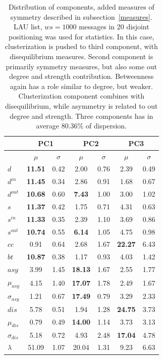 \documentclass[%
 aip,
 jmp,%
 amsmath,amssymb,
 reprint,%
]{revtex4-1}
\begin{document}
\begin{table}
  \centering
  \begin{tabular}{|l|c|c| c|c| c|c|}\hline
 & \multicolumn{2}{c|}{PC1} & \multicolumn{2}{c|}{PC2} & \multicolumn{2}{c|}{PC3}  \\\hline
       & $\mu$ & $\sigma$ & $\mu$ & $\sigma$ & $\mu$ & $\sigma$  \\\hline
$d$            & {\bf 11.51} & 0.42 & 2.00  & 0.76 & 2.39  & 0.49 \\ 
$d^{in}$       & {\bf 11.45} & 0.34 & 2.86  & 0.91 & 1.68  & 0.67 \\
$d^{out}$      & {\bf 10.68} & 0.60 & {\bf 7.43}  & 1.00 & 3.00  & 1.02 \\
$s$            & {\bf 11.37} & 0.42 & 1.75  & 0.71 & 4.31  & 0.63 \\ 
$s^{in}$       & {\bf 11.33} & 0.35 & 2.39  & 1.10 & 3.69  & 0.86 \\ 
$s^{out}$      & {\bf 10.74} & 0.55 & {\bf 6.14}  & 1.05 & 4.75  & 0.98 \\ \hline
$cc$           & 0.91        & 0.64 & 2.68  & 1.67 & {\bf 22.27} & 6.43 \\ 
$bt$           & {\bf 10.87} & 0.38 & 1.17  & 0.93 & 4.03  & 1.42 \\ \hline
$asy$          & 3.99        & 1.45 & {\bf 18.13} & 1.67 & 2.55  & 1.77 \\
$\mu_{asy}$    & 4.15        & 1.40 & {\bf 17.07} & 1.78 & 2.49  & 1.67 \\
$\sigma_{asy}$ & 1.21        & 0.67 & {\bf 17.49} & 0.79 & 3.29  & 2.33 \\
$dis$          & 5.78        & 0.51 & 1.94  & 1.28 & {\bf 24.75} & 3.73 \\
$\mu_{dis}$    & 0.79        & 0.49 & {\bf 14.00} & 1.14 & 3.73  & 3.13 \\
$\sigma_{dis}$ & 5.18        & 0.72 & 4.93  & 2.48 & {\bf 17.04} & 4.78 \\ \hline
$\lambda$      & 51.09       & 1.07 & 20.04 & 1.31 & 9.23  & 6.63 \\ \hline
  \end{tabular}
  \caption{Distribution of components, added measures of symmetry described in subsection~\ref{measures}. LAU list, $ws=1000$ messages in 20 disjoint positioning was used for statistics. In this case, clusterization is pushed to third component, with disequilibrium measures. Second component is primarily symmetry measures, but also some out degree and strength contribution. Betweenness again has a role similar to degree, but weaker. Clusterization component combines with disequilibrium, while asymmetry is related to out degree and strength. Three components has in average 80.36\% of dispersion.}
  \label{compPCA2}
\end{table}
\end{document}
